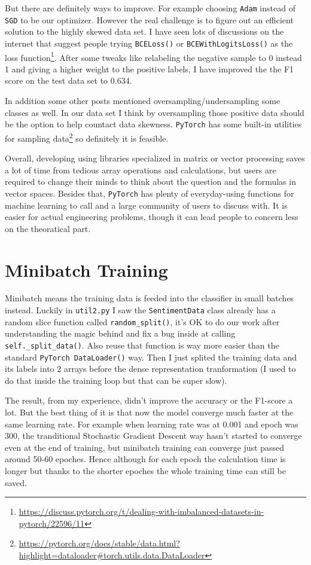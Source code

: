 \documentclass[11pt]{article} %
\begin{document}
But there are definitely ways to improve. For example choosing \verb|Adam| instead of \verb|SGD| to be our optimizer. However the real challenge is to figure out an efficient solution to the highly skewed data set. I have seen lots of discussions on the internet that suggest people trying \verb|BCELoss()| or \verb|BCEWithLogitsLoss()| as the loss function\footnote{\url{https://discuss.pytorch.org/t/dealing-with-imbalanced-datasets-in-pytorch/22596/11}}. After some tweaks like relabeling the negative sample to 0 instead 1 and giving a higher weight to the positive labels, I have improved the the F1 score on the test data set to 0.634.

In addition some other posts mentioned oversampling/undersampling some classes as well. In our data set I think by oversampling those positive data should be the option to help countact data skewness. \verb|PyTorch| has some built-in utilities for sampling data\footnote{\url{https://pytorch.org/docs/stable/data.html?highlight=dataloader#torch.utils.data.DataLoader}} so definitely it is feasible.

Overall, developing using libraries specialized in matrix or vector processing saves a lot of time from tedious array operations and calculations, but users are required to change their minds to think about the question and the formulas in vector spaces. Besides that, \verb|PyTorch| has plenty of everyday-using functions for machine learning to call and a large community of users to discuss with. It is easier for actual engineering problems, though it can lead people to concern less on the theoratical part.

\section{Minibatch Training}

Minibatch means the training data is feeded into the classifier in small batches instead. Luckily in \verb|util2.py| I saw the \verb|SentimentData| class already has a random slice function called \verb|random_split()|, it's OK to do our work after understanding the magic behind and fix a bug inside at calling \verb|self._split_data()|. Also reuse that function is way more easier than the standard \verb|PyTorch DataLoader()| way. Then I just splited the training data and its labels into 2 arrays before the dense representation tranformation (I used to do that inside the training loop but that can be super slow).

The result, from my experience, didn't improve the accuracy or the F1-score a lot. But the best thing of it is that now the model converge much faster at the same learning rate. For example when learning rate was at 0.001 and epoch was 300, the tranditional Stochastic Gradient Descent way hasn't started to converge even at the end of training, but minibatch training can converge just passed around 50-60 epoches. Hence although for each epoch the calculation time is longer but thanks to the shorter epoches the whole training time can still be saved.
\end{document}
